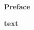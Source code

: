 \begin{Prefácio}
   \vspace*{\fill}
   \begin{center}
      \Large\textbf{Preface}
   \end{center}
   \vspace*{\fill}
    \textbf{text}
   \vspace*{\fill}
\end{Prefácio}

